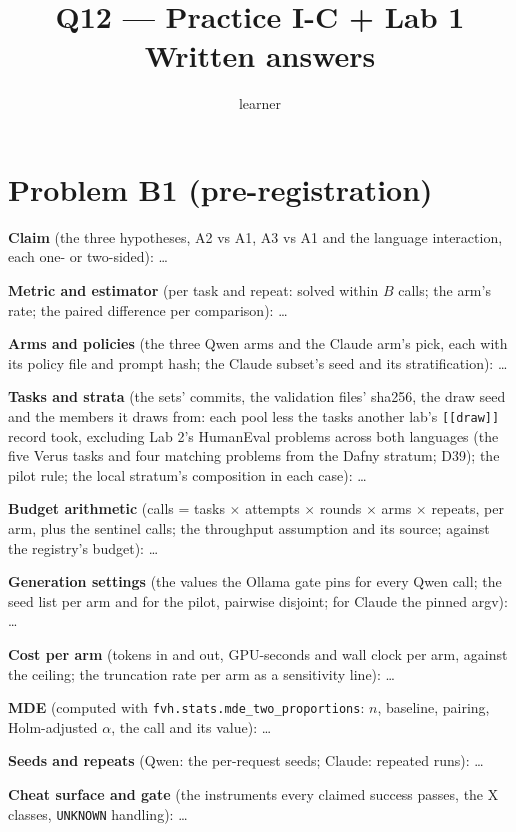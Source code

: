 \documentclass[11pt]{article}
\title{Q12 --- Practice I-C + Lab 1 \\ \large Written answers}
\author{learner}
\date{}
\begin{document}
\maketitle

\section*{Problem B1 (pre-registration)}\label{ans:B1}
\begin{answer}
\textbf{Claim} (the three hypotheses, A2 vs A1, A3 vs A1 and the language
interaction, each one- or two-sided): \dots

\textbf{Metric and estimator} (per task and repeat: solved within $B$ calls; the
arm's rate; the paired difference per comparison): \dots

\textbf{Arms and policies} (the three Qwen arms and the Claude arm's pick, each
with its policy file and prompt hash; the Claude subset's seed and its
stratification): \dots

\textbf{Tasks and strata} (the sets' commits, the validation files' sha256, the
draw seed and the members it draws from: each pool less the tasks another lab's
\texttt{[[draw]]} record took, excluding Lab 2's HumanEval problems across both languages
(the five Verus tasks and four matching problems from the Dafny stratum; D39); the pilot rule; the local stratum's composition in each case): \dots

\textbf{Budget arithmetic} (calls = tasks $\times$ attempts $\times$ rounds
$\times$ arms $\times$ repeats, per arm, plus the sentinel calls; the
throughput assumption and its source; against the registry's budget): \dots

\textbf{Generation settings} (the values the Ollama gate pins for every Qwen
call; the seed list per arm and for the pilot, pairwise disjoint; for Claude
the pinned argv): \dots

\textbf{Cost per arm} (tokens in and out, GPU-seconds and wall clock per arm,
against the ceiling; the truncation rate per arm as a sensitivity line): \dots

\textbf{MDE} (computed with \texttt{fvh.stats.mde\_two\_proportions}: $n$,
baseline, pairing, Holm-adjusted $\alpha$, the call and its value): \dots

\textbf{Seeds and repeats} (Qwen: the per-request seeds; Claude: repeated
runs): \dots

\textbf{Cheat surface and gate} (the instruments every claimed success passes,
the X classes, \texttt{UNKNOWN} handling): \dots


\end{answer}
\end{document}
